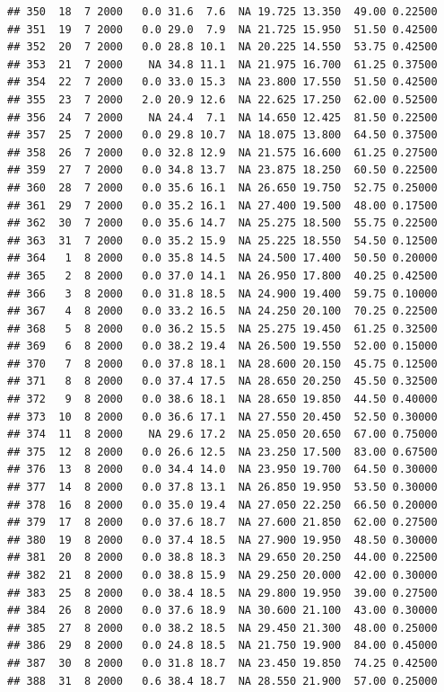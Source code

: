\documentclass[
]{book}
\begin{document}
\begin{verbatim}
## 350  18  7 2000   0.0 31.6  7.6  NA 19.725 13.350  49.00 0.22500
## 351  19  7 2000   0.0 29.0  7.9  NA 21.725 15.950  51.50 0.42500
## 352  20  7 2000   0.0 28.8 10.1  NA 20.225 14.550  53.75 0.42500
## 353  21  7 2000    NA 34.8 11.1  NA 21.975 16.700  61.25 0.37500
## 354  22  7 2000   0.0 33.0 15.3  NA 23.800 17.550  51.50 0.42500
## 355  23  7 2000   2.0 20.9 12.6  NA 22.625 17.250  62.00 0.52500
## 356  24  7 2000    NA 24.4  7.1  NA 14.650 12.425  81.50 0.22500
## 357  25  7 2000   0.0 29.8 10.7  NA 18.075 13.800  64.50 0.37500
## 358  26  7 2000   0.0 32.8 12.9  NA 21.575 16.600  61.25 0.27500
## 359  27  7 2000   0.0 34.8 13.7  NA 23.875 18.250  60.50 0.22500
## 360  28  7 2000   0.0 35.6 16.1  NA 26.650 19.750  52.75 0.25000
## 361  29  7 2000   0.0 35.2 16.1  NA 27.400 19.500  48.00 0.17500
## 362  30  7 2000   0.0 35.6 14.7  NA 25.275 18.500  55.75 0.22500
## 363  31  7 2000   0.0 35.2 15.9  NA 25.225 18.550  54.50 0.12500
## 364   1  8 2000   0.0 35.8 14.5  NA 24.500 17.400  50.50 0.20000
## 365   2  8 2000   0.0 37.0 14.1  NA 26.950 17.800  40.25 0.42500
## 366   3  8 2000   0.0 31.8 18.5  NA 24.900 19.400  59.75 0.10000
## 367   4  8 2000   0.0 33.2 16.5  NA 24.250 20.100  70.25 0.22500
## 368   5  8 2000   0.0 36.2 15.5  NA 25.275 19.450  61.25 0.32500
## 369   6  8 2000   0.0 38.2 19.4  NA 26.500 19.550  52.00 0.15000
## 370   7  8 2000   0.0 37.8 18.1  NA 28.600 20.150  45.75 0.12500
## 371   8  8 2000   0.0 37.4 17.5  NA 28.650 20.250  45.50 0.32500
## 372   9  8 2000   0.0 38.6 18.1  NA 28.650 19.850  44.50 0.40000
## 373  10  8 2000   0.0 36.6 17.1  NA 27.550 20.450  52.50 0.30000
## 374  11  8 2000    NA 29.6 17.2  NA 25.050 20.650  67.00 0.75000
## 375  12  8 2000   0.0 26.6 12.5  NA 23.250 17.500  83.00 0.67500
## 376  13  8 2000   0.0 34.4 14.0  NA 23.950 19.700  64.50 0.30000
## 377  14  8 2000   0.0 37.8 13.1  NA 26.850 19.950  53.50 0.30000
## 378  16  8 2000   0.0 35.0 19.4  NA 27.050 22.250  66.50 0.20000
## 379  17  8 2000   0.0 37.6 18.7  NA 27.600 21.850  62.00 0.27500
## 380  19  8 2000   0.0 37.4 18.5  NA 27.900 19.950  48.50 0.30000
## 381  20  8 2000   0.0 38.8 18.3  NA 29.650 20.250  44.00 0.22500
## 382  21  8 2000   0.0 38.8 15.9  NA 29.250 20.000  42.00 0.30000
## 383  25  8 2000   0.0 38.4 18.5  NA 29.800 19.950  39.00 0.27500
## 384  26  8 2000   0.0 37.6 18.9  NA 30.600 21.100  43.00 0.30000
## 385  27  8 2000   0.0 38.2 18.5  NA 29.450 21.300  48.00 0.25000
## 386  29  8 2000   0.0 24.8 18.5  NA 21.750 19.900  84.00 0.45000
## 387  30  8 2000   0.0 31.8 18.7  NA 23.450 19.850  74.25 0.42500
## 388  31  8 2000   0.6 38.4 18.7  NA 28.550 21.900  57.00 0.25000

\end{verbatim}
\end{document}
